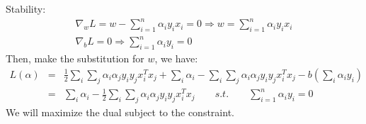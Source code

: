 \documentclass{article}
\begin{document}
Stability:
\begin{eqnarray}
\nabla_w L= w-\sum_{i=1}^n\alpha_iy_ix_i=0 \Rightarrow w=\sum_{i=1}^n\alpha_iy_ix_i\\
\nabla_b L=0 \Rightarrow \sum_{i=1}^n\alpha_iy_i=0
\end{eqnarray}
Then, make the substitution for $w$, we have:
\begin{eqnarray*}
L(\alpha)&=&\frac{1}{2}\sum_i\sum_j\alpha_i\alpha_jy_iy_jx^T_ix_j+\sum_i\alpha_i-\sum_i\sum_j\alpha_i\alpha_jy_iy_jx^T_ix_j-b(\sum_i\alpha_iy_i)\\
&=&\sum_i\alpha_i-\frac{1}{2}\sum_i\sum_j\alpha_i\alpha_jy_iy_jx^T_ix_j \qquad s.t. \qquad \sum_{i=1}^n\alpha_iy_i=0
\end{eqnarray*}
We will maximize the dual subject to the constraint.
\end{document}
